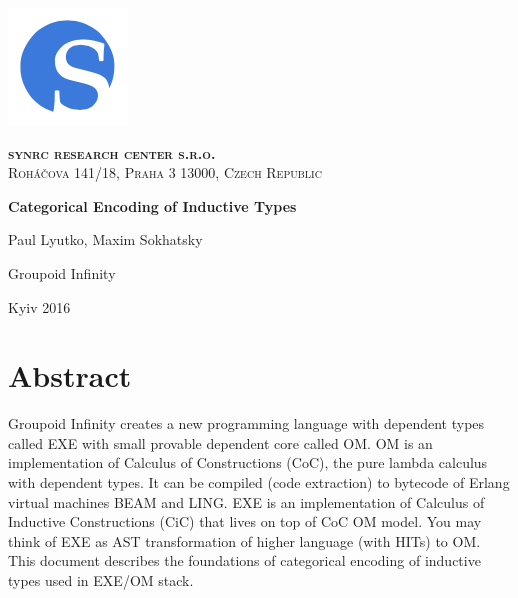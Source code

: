 \documentclass[11pt,oneside]{article}
\begin{document}
\thispagestyle{empty}
\begin{center}

\begin{minipage}[t]{2cm}
    \includegraphics[scale=0.4]{img/S}
\end{minipage}
\begin{minipage}[t]{12cm}
    \begin{flushright}
        \textsc{{\Large {\bf {\color{Blue}syn}{\color{OrangeRed}rc} research center s.r.o.}}}\\
        \textsc{Roháčova 141/18, Praha 3 13000, Czech Republic}\\
    \end{flushright}
\end{minipage}

\vspace{3cm}

    \vspace{3cm}   {\Large \bf Categorical Encoding of Inductive Types\\}\par
    \vspace{0.3cm} {\Large Paul Lyutko, Maxim Sokhatsky\par}
    \vspace{6cm} {\Large Groupoid Infinity\par}
    \vspace{0.3cm}   {\Large Kyiv 2016}

\end{center}

\newpage
\vspace{2cm}
\tableofcontents
\newpage

\section{Abstract}

Groupoid Infinity creates a new programming language with dependent types called EXE with small provable dependent core called OM.
OM is an implementation of Calculus of Constructions (CoC), the pure lambda calculus with dependent types.
It can be compiled (code extraction) to bytecode of Erlang virtual machines BEAM and LING.
EXE is an implementation of Calculus of Inductive Constructions (CiC) that lives on top of CoC OM model.
You may think of EXE as AST transformation of higher language (with HITs) to OM. This document describes
the foundations of categorical encoding of inductive types used in EXE/OM stack.
\end{document}
